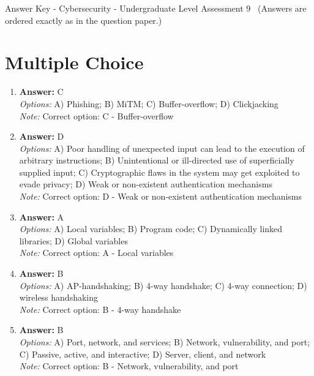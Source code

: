 \documentclass[12pt]{article}
\begin{document}
\begin{center}
Answer Key - Cybersecurity - Undergraduate Level Assessment 9 \
\small (Answers are ordered exactly as in the question paper.)
\end{center}

\section*{Multiple Choice}
\begin{enumerate}[label=\arabic*.]
\item \textbf{Answer:} C
\\ \textit{Options:} A) Phishing; B) MiTM; C) Buffer-overflow; D) Clickjacking
\\ \textit{Note:} Correct option: C - Buffer-overflow
\item \textbf{Answer:} D
\\ \textit{Options:} A) Poor handling of unexpected input can lead to the execution of arbitrary instructions; B) Unintentional or ill-directed use of superficially supplied input; C) Cryptographic flaws in the system may get exploited to evade privacy; D) Weak or non-existent authentication mechanisms
\\ \textit{Note:} Correct option: D - Weak or non-existent authentication mechanisms
\item \textbf{Answer:} A
\\ \textit{Options:} A) Local variables; B) Program code; C) Dynamically linked libraries; D) Global variables
\\ \textit{Note:} Correct option: A - Local variables
\item \textbf{Answer:} B
\\ \textit{Options:} A) AP-handshaking; B) 4-way handshake; C) 4-way connection; D) wireless handshaking
\\ \textit{Note:} Correct option: B - 4-way handshake
\item \textbf{Answer:} B
\\ \textit{Options:} A) Port, network, and services; B) Network, vulnerability, and port; C) Passive, active, and interactive; D) Server, client, and network
\\ \textit{Note:} Correct option: B - Network, vulnerability, and port
\end{enumerate}
\end{document}
